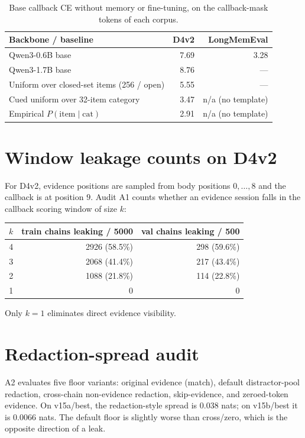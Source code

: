 \documentclass[11pt]{article}
\begin{document}
\begin{table}[h]
\centering
\small
\caption{Base callback CE without memory or fine-tuning, on the
callback-mask tokens of each corpus.}
\begin{tabular}{lrr}
\toprule
Backbone / baseline & D4v2 & LongMemEval \\
\midrule
Qwen3-0.6B base                              & 7.69 & 3.28 \\
Qwen3-1.7B base                              & 8.76 & --- \\
Uniform over closed-set items (256 / open)   & 5.55 & --- \\
Cued uniform over 32-item category           & 3.47 & n/a (no template) \\
Empirical $P(\mathrm{item}\mid\mathrm{cat})$ & 2.91 & n/a (no template) \\
\bottomrule
\end{tabular}
\end{table}

\section{Window leakage counts on D4v2}
\label{app:window_leak}

For D4v2, evidence positions are sampled from body positions
$0,\ldots,8$ and the callback is at position $9$. Audit A1 counts
whether an evidence session falls in the callback scoring window of
size $k$:
\begin{center}\small
\begin{tabular}{rrr}
\toprule
$k$ & train chains leaking / 5000 & val chains leaking / 500 \\
\midrule
4 & 2926 (58.5\%) & 298 (59.6\%) \\
3 & 2068 (41.4\%) & 217 (43.4\%) \\
2 & 1088 (21.8\%) & 114 (22.8\%) \\
1 & 0 & 0 \\
\bottomrule
\end{tabular}
\end{center}
Only $k=1$ eliminates direct evidence visibility.

\section{Redaction-spread audit}
\label{app:redaction}

A2 evaluates five floor variants: original evidence (match),
default distractor-pool redaction, cross-chain non-evidence
redaction, skip-evidence, and zeroed-token evidence. On v15a/best,
the redaction-style spread is $0.038$ nats; on v15b/best it is
$0.0066$ nats. The default floor is slightly worse than cross/zero,
which is the opposite direction of a leak.
\end{document}
